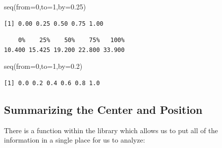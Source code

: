 \documentclass[
  letterpaper,
  DIV=11,
  numbers=noendperiod]{scrreprt}
\newenvironment{Shaded}{\begin{snugshade}}{\end{snugshade}}
\newcommand{\AttributeTok}[1]{\textcolor[rgb]{0.40,0.45,0.13}{#1}}
\newcommand{\DecValTok}[1]{\textcolor[rgb]{0.68,0.00,0.00}{#1}}
\newcommand{\FloatTok}[1]{\textcolor[rgb]{0.68,0.00,0.00}{#1}}
\newcommand{\FunctionTok}[1]{\textcolor[rgb]{0.28,0.35,0.67}{#1}}
\newcommand{\NormalTok}[1]{\textcolor[rgb]{0.00,0.23,0.31}{#1}}
\newcommand{\SpecialCharTok}[1]{\textcolor[rgb]{0.37,0.37,0.37}{#1}}
\begin{document}
\begin{Shaded}
\begin{Highlighting}[]
\FunctionTok{seq}\NormalTok{(}\AttributeTok{from=}\DecValTok{0}\NormalTok{,}\AttributeTok{to=}\DecValTok{1}\NormalTok{,}\AttributeTok{by=}\FloatTok{0.25}\NormalTok{)}
\end{Highlighting}
\end{Shaded}

\begin{verbatim}
[1] 0.00 0.25 0.50 0.75 1.00
\end{verbatim}

\begin{Shaded}
\end{Shaded}

\begin{verbatim}
    0%    25%    50%    75%   100% 
10.400 15.425 19.200 22.800 33.900 
\end{verbatim}

\begin{Shaded}
\begin{Highlighting}[]
\FunctionTok{seq}\NormalTok{(}\AttributeTok{from=}\DecValTok{0}\NormalTok{,}\AttributeTok{to=}\DecValTok{1}\NormalTok{,}\AttributeTok{by=}\FloatTok{0.2}\NormalTok{)}
\end{Highlighting}
\end{Shaded}

\begin{verbatim}
[1] 0.0 0.2 0.4 0.6 0.8 1.0
\end{verbatim}

\subsection{Summarizing the Center and
Position}\label{summarizing-the-center-and-position}

There is a function within the library which allows us to put all of the
information in a single place for us to analyze:

\begin{Shaded}
\end{Shaded}
\end{document}
